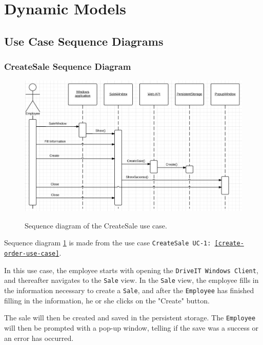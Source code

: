 \section{Dynamic Models}

\subsection{Use Case Sequence Diagrams}
\subsubsection{CreateSale Sequence Diagram}
\begin{figure}[H]
	\centering
		\includegraphics[width=\textwidth]{Figures/SequenceDiagram-CreateSale}\\
	\caption{Sequence diagram of the CreateSale use case.}
  \label{fig:SequenceDiagram-CreateSale}
\end{figure}

Sequence diagram \ref{fig:SequenceDiagram-CreateSale} is made from the use case \texttt{CreateSale UC-1: \ref{create-order-use-case}}. 

In this use case, the employee starts with opening the \texttt{DriveIT Windows Client}, and thereafter navigates to the \texttt{Sale} view. In the \texttt{Sale} view, the employee fills in the information necessary to create a \texttt{Sale}, and after the \texttt{Employee} has finished filling in the information, he or she clicks on the "Create" button.

The sale will then be created and saved in the persistent storage. The \texttt{Employee} will then be prompted with a pop-up window, telling if the save was a success or an error has occurred.

